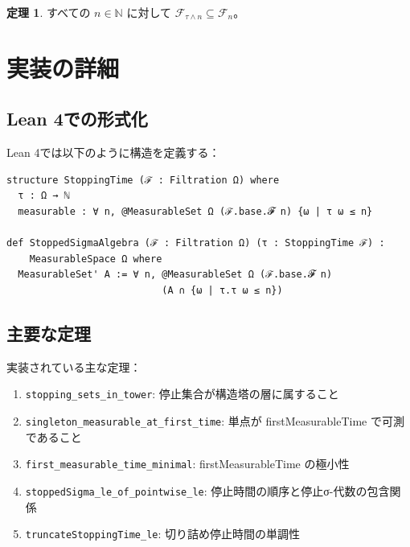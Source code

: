 \documentclass[a4paper,12pt]{ltjsarticle}
\theoremstyle{definition}
\newtheorem{theorem}[definition]{定理}
\begin{document}
\begin{center}
\end{center}

\begin{theorem}
すべての $n \in \mathbb{N}$ に対して $\mathcal{F}_{\tau \wedge n} \subseteq \mathcal{F}_n$。
\end{theorem}

\section{実装の詳細}

\subsection{Lean 4での形式化}

Lean 4では以下のように構造を定義する：

\begin{verbatim}
structure StoppingTime (ℱ : Filtration Ω) where
  τ : Ω → ℕ
  measurable : ∀ n, @MeasurableSet Ω (ℱ.base.𝓕 n) {ω | τ ω ≤ n}

def StoppedSigmaAlgebra (ℱ : Filtration Ω) (τ : StoppingTime ℱ) :
    MeasurableSpace Ω where
  MeasurableSet' A := ∀ n, @MeasurableSet Ω (ℱ.base.𝓕 n)
                           (A ∩ {ω | τ.τ ω ≤ n})
\end{verbatim}

\subsection{主要な定理}

実装されている主な定理：
\begin{enumerate}
  \item \texttt{stopping\_sets\_in\_tower}: 停止集合が構造塔の層に属すること
  \item \texttt{singleton\_measurable\_at\_first\_time}:
        単点が firstMeasurableTime で可測であること
  \item \texttt{first\_measurable\_time\_minimal}: firstMeasurableTime の極小性
  \item \texttt{stoppedSigma\_le\_of\_pointwise\_le}:
        停止時間の順序と停止σ-代数の包含関係
  \item \texttt{truncateStoppingTime\_le}: 切り詰め停止時間の単調性
\end{enumerate}
\end{document}

